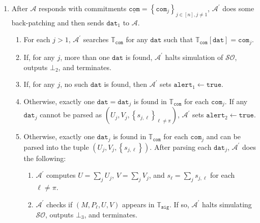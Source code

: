 \documentclass{mrl}
\theoremstyle{definition}
\numberwithin{theorem}{subsection}
\newcommand{\adversary}{\mathcal{A}}
\begin{document}
\begin{description}
\begin{description}
\begin{enumerate}
\begin{enumerate}

\end{enumerate}
 
\item After $\adversary$ responds with commitments $\underline{\texttt{com}} = \left\{\texttt{com}_j\right\}_{j \in [n], j \neq 1}$, $\adversary^\prime$ does some back-patching and then sends $\texttt{dat}_1$ to $\adversary$.
\begin{enumerate}
\item For each $j > 1$, $\adversary^\prime$ searches $\mathbb{T}_{\texttt{com}}$ for any $\texttt{dat}$ such that $\mathbb{T}_{\texttt{com}}\left[\texttt{dat}\right] = \texttt{com}_j$.

\item If, for any $j$, more than one $\texttt{dat}$ is found, $\adversary^\prime$ halts simulation of $\mathcal{SO}$, outputs $\bot_2$, and terminates. 

\item If, for any $j$, no such $\texttt{dat}$ is found, then $\adversary^\prime$ sets $\texttt{alert}_1 \leftarrow \texttt{true}$.

\item \label{gather} Otherwise, exactly one $\texttt{dat} = \texttt{dat}_j$ is found in $\mathbb{T}_{\texttt{com}}$ for each $\texttt{com}_j$. If any $\texttt{dat}_j$ cannot be parsed as $(U_j, V_j, \left\{s_{j, \ell}\right\}_{\ell \neq \pi})$, $\adversary^\prime$ sets $\texttt{alert}_2 \leftarrow \texttt{true}$. %

\item Otherwise, exactly one $\texttt{dat}_j$ is found in $\mathbb{T}_{\texttt{com}}$ for each $\texttt{com}_j$ and can be parsed into the tuple $(U_j, V_j, \left\{s_{j,\ell}\right\})$. After parsing each $\texttt{dat}_j$, $\adversary^\prime$ does the following:
\begin{enumerate}
\item $\adversary^\prime$ computes $U = \sum_j U_j$, $V = \sum_j V_j$, and $s_\ell = \sum_j s_{j,\ell}$ for each $\ell \neq \pi$.


\item $\adversary^\prime$ checks if $(M, P_\ell, U, V)$ appears in $\mathbb{T}_{\texttt{sig}}$. If so, $\adversary^\prime$ halts simulating $\mathcal{SO}$, outputs $\bot_3$, and terminates.  


\end{enumerate}
\end{enumerate}
\end{enumerate}
\end{description}
\end{description}
\end{document}
